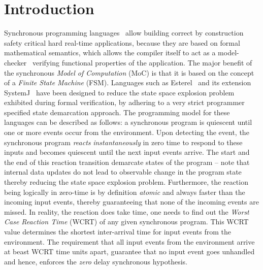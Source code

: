 \section{Introduction}
\label{sec:introduction}

Synchronous programming languages~\cite{berry92} allow building correct
by construction safety critical hard real-time applications, because
they are based on formal mathematical semantics, which allows the
compiler itself to act as a model-checker~\cite{jagadeesan1995safety}
verifying functional properties of the application. The major benefit of
the synchronous \textit{Model of Computation} (MoC) is that it is based
on the concept of a \textit{Finite State Machine} (FSM). Languages such
as Esterel~\cite{berry92} and its extension SystemJ~\cite{amal10} have
been designed to reduce the state space explosion problem exhibited
during formal verification, by adhering to a very strict programmer
specified state demarcation approach. The programming model for these
languages can be described as follows: a synchronous program is
quiescent until one or more events occur from the environment. Upon
detecting the event, the synchronous program \textit{reacts}
\textit{instantaneously} in zero time to respond to these inputs and
becomes quiescent until the next input events arrive. The start and the
end of this reaction transition demarcate states of the program -- note
that internal data updates do not lead to observable change in the
program state thereby reducing the state space explosion problem.
Furthermore, the reaction being logically in zero-time is by definition
\textit{atomic} and always faster than the incoming input events,
thereby guaranteeing that none of the incoming events are missed. In
reality, the reaction does take time, one needs to find out the
\textit{Worst Case Reaction Time} (WCRT) of any given synchronous
program. This WCRT value determines the shortest inter-arrival time for
input events from the environment. {\color{black} The requirement that
  all input events from the environment arrive at beast WCRT time units
  apart, guarantee that no input event goes unhandled and hence,
  enforces the \textit{zero} delay synchronous hypothesis.}

